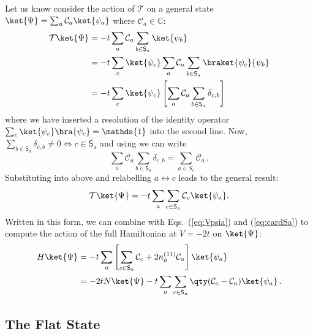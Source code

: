 Let us know consider the action of $\mathcal{T}$ 
    on a general state $\ket{\Psi} = \sum_a \mathcal{C}_a \ket{\psi_a}$ where $\mathcal{C}_a \in \mathds{C}$:
%
\begin{align}
    \mathcal{T}\ket{\Psi} &= -t \sum_a \mathcal{C}_a \sum_{b \in \mathsf{S}_a} \ket{\psi_b} \nonumber \\
                          &= -t \sum_c \ket{\psi_c} \sum_a \mathcal{C}_a
                          \sum_{b \in \mathsf{S}_a} \braket{\psi_c}{\psi_b} \nonumber  \\ 
                          &= -t \sum_c \ket{\psi_c}\left[ \sum_a \mathcal{C}_a
                          \sum_{b \in \mathsf{S}_a} \delta_{c,b}\right] 
    \label{eq:TPsi1}
\end{align}
%
where we have inserted a resolution of the identity operator $\sum_c
\ket{\psi_c}\bra{\psi_c} = \mathds{1}$ into the second line. Now, $\sum_{b \in
\mathsf{S}_a}\delta_{c,b} \ne 0 \iff c \in \mathsf{S}_a$ and using
 we can write
%
\begin{equation}
    \sum_a \mathcal{C}_a \sum_{b \in \mathsf{S}_a} \delta_{c,b} = \sum_{a \in S_c}
    \mathcal{C}_a \, .
\end{equation}
%
Substituting into  above and relabelling $a \leftrightarrow c$
leads to the general result:
\begin{equation}
    \mathcal{T}\ket{\Psi} = -t \sum_a \sum_{c \in \mathsf{S}_a} \mathcal{C}_c  \ket{\psi_a}.
    \label{eq:TPsi2}
\end{equation}
%
Written in this form, we can combine  with
Eqs.~(\ref{eq:Vpsia}) and (\ref{eq:cardSa}) to compute the action of the full Hamiltonian at $V=-2t$ on $\ket{\Psi}$:
%
\begin{align}
    H \ket{\Psi} &= -t \sum_a \left[\sum_{c \in \mathsf{S}_a} \mathcal{C}_c + 2
    n^{(11)}_a \mathcal{C}_a \right] \ket{\psi_a} \nonumber \\ 
                 &= -2t N \ket{\Psi} - t \sum_a \sum_{c \in \mathsf{S}_a}
                 \qty(\mathcal{C}_c - \mathcal{C}_a)\ket{\psi_a}\, .
\label{eq:HPsi}
\end{align}
%

\subsection{The Flat State}

